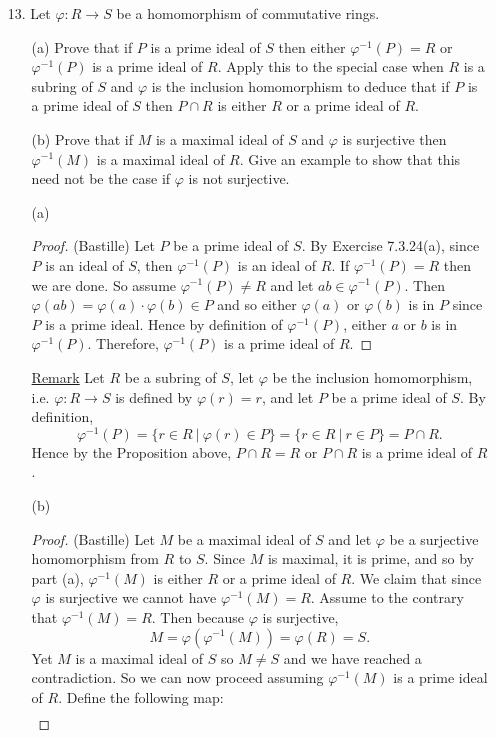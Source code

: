 \documentclass[10pt]{article}
\begin{document}
\begin{itemize}
\item[13.] Let $\varphi:R \to S$ be a homomorphism of commutative rings.
\begin{enumerate}
\item[(a)] Prove that if $P$ is a prime ideal of $S$ then either $\varphi^{-1}(P)=R$ or $\varphi^{-1}(P)$ is a prime ideal of $R$. Apply this to the special case when $R$ is a subring of $S$ and $\varphi$ is the inclusion homomorphism to deduce that if $P$ is a prime ideal of $S$ then $P \cap R$ is either $R$ or a prime ideal of $R$.
\item[(b)] Prove that if $M$ is a maximal ideal of $S$ and $\varphi$ is surjective then $\varphi^{-1}(M)$ is a maximal ideal of $R$. Give an example to show that this need not be the case if $\varphi$ is not surjective.
\item[(a)]
\begin{proof} (Bastille) 
 Let $P$ be a prime ideal of $S$. By Exercise 7.3.24(a), since $P$ is an ideal of $S$, then $\varphi^{-1}(P)$ is an ideal of $R$. If $\varphi^{-1}(P)=R$ then we are done. So assume $\varphi^{-1}(P) \neq R$ and let $ab \in \varphi^{-1}(P)$. Then $\varphi(ab)=\varphi(a) \cdot \varphi(b) \in P$ and so either $\varphi(a)$ or $\varphi(b)$ is in $P$ since $P$ is a prime ideal. Hence by definition of $\varphi^{-1}(P)$, either $a$ or $b$ is in $\varphi^{-1}(P)$. Therefore, $\varphi^{-1}(P)$ is a prime ideal of $R$.
\end{proof}
\underline{Remark} Let $R$ be a subring of $S$, let $\varphi$ be the inclusion homomorphism, i.e. $\varphi: R \to S$ is defined by $\varphi(r)=r$, and let $P$ be a prime ideal of $S$. By definition,
$$\varphi^{-1}(P)= \{r \in R \ | \ \varphi(r) \in P \}= \{ r \in R \ | \ r \in P \}= P \cap R.$$
Hence by the Proposition above, $P \cap R= R$ or $P \cap R$ is a prime ideal of $R$.
\item[(b)]
\begin{proof} (Bastille) Let $M$ be a maximal ideal of $S$ and let $\varphi$ be a surjective homomorphism from $R$ to $S$. Since $M$ is maximal, it is prime, and so by part (a), $\varphi^{-1}(M)$ is either $R$ or a prime ideal of $R$. We claim that since $\varphi$ is surjective we cannot have $\varphi^{-1}(M)=R$. Assume to the contrary that $\varphi^{-1}(M)=R$. Then because $\varphi$ is surjective,
$$M=\varphi(\varphi^{-1}(M))=\varphi(R)=S.$$ 
Yet $M$ is a maximal ideal of $S$ so $M \neq S$ and we have reached a contradiction. So we can now proceed assuming $\varphi^{-1}(M)$ is a prime ideal of $R$. Define the following map:
\begin{align*}

\end{align*}
\end{proof}
\end{enumerate}
\end{itemize}
\end{document}
